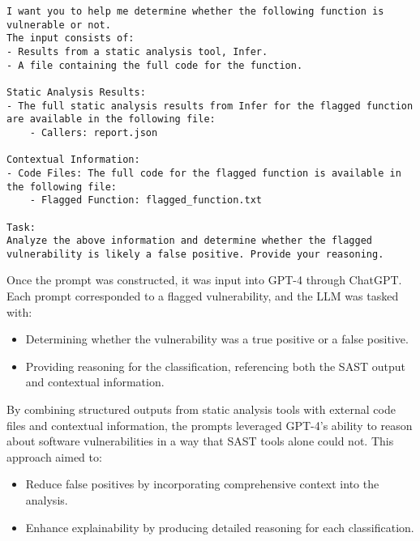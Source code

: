 \begin{lstlisting}[breaklines=true, caption={Prompt structure for GPT-4 analysis of flagged vulnerabilities.}, label={prompt}]
I want you to help me determine whether the following function is vulnerable or not.
The input consists of:
- Results from a static analysis tool, Infer.
- A file containing the full code for the function.

Static Analysis Results:
- The full static analysis results from Infer for the flagged function are available in the following file:
    - Callers: report.json

Contextual Information:
- Code Files: The full code for the flagged function is available in the following file:
    - Flagged Function: flagged_function.txt

Task:
Analyze the above information and determine whether the flagged vulnerability is likely a false positive. Provide your reasoning.
\end{lstlisting}

Once the prompt was constructed, it was input into GPT-4 through ChatGPT. Each prompt corresponded to a flagged vulnerability, and the LLM was tasked with:
\begin{itemize}
    \item Determining whether the vulnerability was a true positive or a false positive.
    \item Providing reasoning for the classification, referencing both the SAST output and contextual information.
\end{itemize}

By combining structured outputs from static analysis tools with external code files and contextual information, the prompts leveraged GPT-4’s ability to reason about software vulnerabilities in a way that SAST tools alone could not. This approach aimed to:
\begin{itemize}
    \item Reduce false positives by incorporating comprehensive context into the analysis.
    \item Enhance explainability by producing detailed reasoning for each classification.
\end{itemize}
